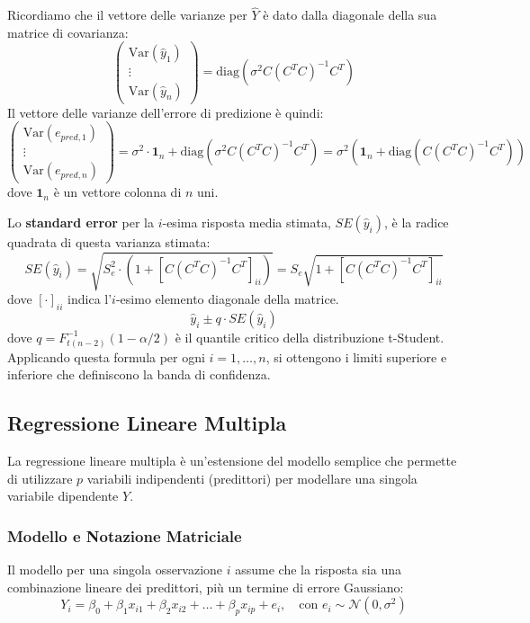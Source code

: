 Ricordiamo che il vettore delle varianze per \(\hat{Y}\) è dato dalla diagonale della sua matrice di covarianza:
\[
    \begin{pmatrix} \text{Var}(\hat{y}_1) \\ \vdots \\ \text{Var}(\hat{y}_n) \end{pmatrix} = \text{diag}\left( \sigma^2 C (C^T C)^{-1} C^T \right)
\]
Il vettore delle varianze dell'errore di predizione è quindi:
\[
    \begin{pmatrix} \text{Var}(e_{pred, 1}) \\ \vdots \\ \text{Var}(e_{pred, n}) \end{pmatrix} = 
    \sigma^2 \cdot \mathbf{1}_n + \text{diag}\left( \sigma^2 C (C^T C)^{-1} C^T \right)
    = \sigma^2 \left( \mathbf{1}_n + \text{diag}\left( C (C^T C)^{-1} C^T \right) \right)
\]
dove \(\mathbf{1}_n\) è un vettore colonna di \(n\) uni.

Lo \textbf{standard error} per la \(i\)-esima risposta media stimata, \(SE(\hat{y}_i)\), è la radice quadrata di questa varianza stimata:
\[
    SE(\hat{y}_i) = \sqrt{S_e^2 \cdot \left(1 + \left[ C (C^T C)^{-1} C^T \right]_{ii}\right)} = S_e \sqrt{1 + \left[ C (C^T C)^{-1} C^T \right]_{ii}}
\]
dove \([ \cdot ]_{ii}\) indica l'\(i\)-esimo elemento diagonale della matrice.
\[
    \hat{y}_i \pm q \cdot SE(\hat{y}_i)
\]
dove \(q = F_{t(n-2)}^{-1}(1-\alpha/2)\) è il quantile critico della distribuzione t-Student. Applicando questa formula per ogni \(i=1, \dots, n\), si ottengono i limiti superiore e inferiore che definiscono la banda di confidenza.


\subsection{Regressione Lineare Multipla}

La regressione lineare multipla è un'estensione del modello semplice che permette di utilizzare \(p\) variabili indipendenti (predittori) per modellare una singola variabile dipendente \(Y\).

\subsubsection{Modello e Notazione Matriciale}

Il modello per una singola osservazione \(i\) assume che la risposta sia una combinazione lineare dei predittori, più un termine di errore Gaussiano:
\[
    Y_i = \beta_0 + \beta_1 x_{i1} + \beta_2 x_{i2} + \dots + \beta_p x_{ip} + e_i, \quad \text{con } e_i \sim \mathcal{N}(0, \sigma^2)
\]

